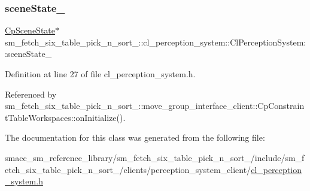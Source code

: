 \subsubsection{\texorpdfstring{scene\+State\+\_\+}{sceneState\_}}
{\footnotesize\ttfamily \hyperlink{classsm__fetch__six__table__pick__n__sort__1_1_1cl__perception__system_1_1CpSceneState}{Cp\+Scene\+State}$\ast$ sm\+\_\+fetch\+\_\+six\+\_\+table\+\_\+pick\+\_\+n\+\_\+sort\+\_\+::cl\+\_\+perception\+\_\+system\+::\+Cl\+Perception\+System\+::scene\+State\+\_\+}



Definition at line 27 of file cl\+\_\+perception\+\_\+system.\+h.



Referenced by sm\+\_\+fetch\+\_\+six\+\_\+table\+\_\+pick\+\_\+n\+\_\+sort\+\_\+::move\+\_\+group\+\_\+interface\+\_\+client\+::\+Cp\+Constraint\+Table\+Workspaces\+::on\+Initialize().



The documentation for this class was generated from the following file\+:\begin{DoxyCompactItemize}
\item 
smacc\+\_\+sm\+\_\+reference\+\_\+library/sm\+\_\+fetch\+\_\+six\+\_\+table\+\_\+pick\+\_\+n\+\_\+sort\+\_/include/sm\+\_\+fetch\+\_\+six\+\_\+table\+\_\+pick\+\_\+n\+\_\+sort\+\_/clients/perception\+\_\+system\+\_\+client/\hyperlink{sm__fetch__six__table__pick__n__sort__1_2include_2sm__fetch__six__table__pick__n__sort__1_2clien27a9ac326023dd544febf310659c804a}{cl\+\_\+perception\+\_\+system.\+h}\end{DoxyCompactItemize}
